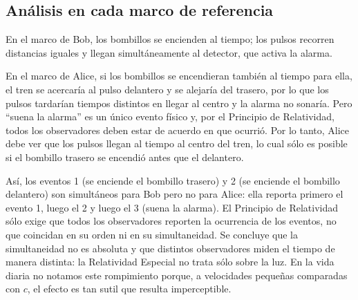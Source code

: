\subsection{Análisis en cada marco de referencia}

En el marco de Bob, los bombillos se encienden al tiempo; los pulsos recorren distancias iguales y llegan simultáneamente al detector, que activa la alarma.



En el marco de Alice, si los bombillos se encendieran también al tiempo para ella, el tren se acercaría al pulso delantero y se alejaría del trasero, por lo que los pulsos tardarían tiempos distintos en llegar al centro y la alarma no sonaría. Pero ``suena la alarma'' es un único evento físico y, por el Principio de Relatividad, todos los observadores deben estar de acuerdo en que ocurrió. Por lo tanto, Alice debe ver que los pulsos llegan al tiempo al centro del tren, lo cual sólo es posible si el bombillo trasero se encendió antes que el delantero.



Así, los eventos 1 (se enciende el bombillo trasero) y 2 (se enciende el bombillo delantero) son simultáneos para Bob pero no para Alice: ella reporta primero el evento 1, luego el 2 y luego el 3 (suena la alarma). El Principio de Relatividad sólo exige que todos los observadores reporten la ocurrencia de los eventos, no que coincidan en su orden ni en su simultaneidad. Se concluye que la simultaneidad no es absoluta y que distintos observadores miden el tiempo de manera distinta: la Relatividad Especial no trata sólo sobre la luz. En la vida diaria no notamos este rompimiento porque, a velocidades pequeñas comparadas con $c$, el efecto es tan sutil que resulta imperceptible.